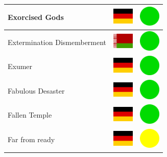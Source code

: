\documentclass[12pt, a4paper, twoside]{report}
\begin{document}
\begin{center}
\begin{longtable}{|p{5cm}|p{2cm}|p{2cm}|}
Exorcised Gods & \includegraphics[width=1cm]{4x3/de} & \includegraphics[width=1cm]{likes/y} \\ \hline
Extermination Dismemberment & \includegraphics[width=1cm]{4x3/by} & \includegraphics[width=1cm]{likes/y} \\ \hline
Exumer & \includegraphics[width=1cm]{4x3/de} & \includegraphics[width=1cm]{likes/y} \\ \hline
Fabulous Desaster & \includegraphics[width=1cm]{4x3/de} & \includegraphics[width=1cm]{likes/y} \\ \hline
Fallen Temple & \includegraphics[width=1cm]{4x3/de} & \includegraphics[width=1cm]{likes/y} \\ \hline
Far from ready & \includegraphics[width=1cm]{4x3/de} & \includegraphics[width=1cm]{likes/m} \\ \hline

\end{longtable}
\end{center}
\end{document}
